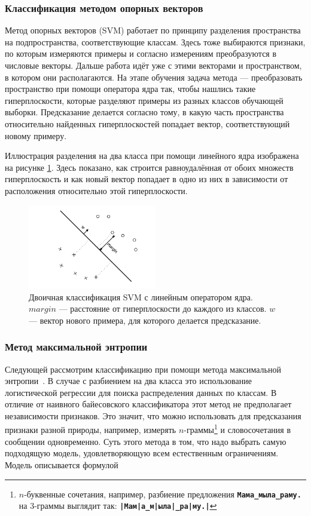 \subsubsection{Классификация методом опорных векторов}
Метод опорных векторов (SVM) \cite{tong2002support} работает по принципу разделения пространства на
подпространства, соответствующие классам. Здесь тоже выбираются признаки, по которым измеряются
примеры и согласно измерениям преобразуются в числовые векторы. Дальше работа идёт уже с этими векторами и
пространством, в котором они располагаются. На этапе обучения задача метода --- преобразовать
пространство при помощи оператора ядра так, чтобы нашлись такие гиперплоскости,
которые разделяют примеры из разных классов обучающей выборки. Предсказание делается
согласно тому, в какую часть пространства относительно найденных гиперплоскостей попадает вектор,
соответствующий новому примеру.

Иллюстрация разделения на два класса при помощи линейного ядра изображена на рисунке
\ref{linear_svm}. Здесь показано, как строится равноудалённая от обоих множеств гиперплоскость и как
новый вектор попадает в одно из них в зависимости от расположения относительно этой гиперплоскости.

\begin{figure}
  \centering
  \includegraphics[width=0.5\textwidth]{linear_svm}
  \caption{Двоичная классификация SVM с линейным оператором ядра. $margin$ --- расстояние от
    гиперплоскости до каждого из классов. $w$ --- вектор нового примера, для которого делается предсказание.}\label{linear_svm}
\end{figure}

\subsubsection{Метод максимальной энтропии}
Следующей рассмотрим классификацию при помощи метода максимальной энтропии~\cite{nigam1999using}. В
случае с разбиением на два класса это использование логистической регрессии для поиска распределения
данных по классам. В отличие от наивного байесовского классификатора этот метод не
предполагает независимости признаков. Это значит, что можно использовать для предсказания признаки
разной природы, например, измерять $n$-граммы\footnote{$n$-буквенные сочетания, например, разбиение
  предложения \textbf{\texttt{Мама\_мыла\_раму.}}
  на 3-граммы выглядит так: \textbf{\texttt{|Мам|а\_м|ыла|\_ра|му.|}}} и словосочетания в сообщении одновременно.
Суть этого метода в том, что надо выбрать самую
подходящую модель, удовлетворяющую всем естественным ограничениям. Модель описывается формулой

